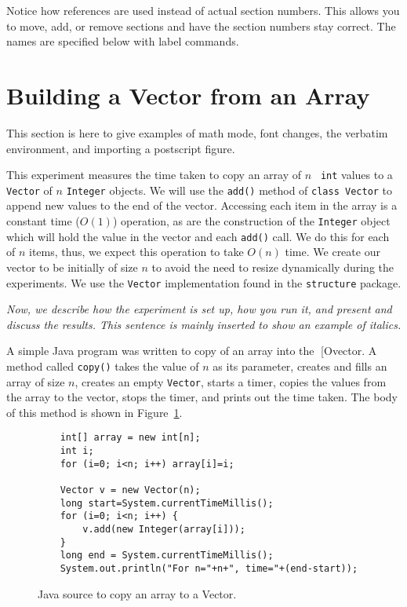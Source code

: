 \documentclass[12pt]{article}
\newcommand{\singlespace}{
  \protect\renewcommand\baselinestretch{1.0}
  \protect\normalsize
}
\begin{document}
Notice how references are used instead of actual section numbers.
This allows you to move, add, or remove sections and have the section
numbers stay correct.  The names are specified below with label commands.

\section{Building a Vector from an Array}
\label{sec:vectarray}

This section is here to give examples of math mode, font changes, the
verbatim environment, and importing a postscript figure.

This experiment measures the time taken to copy an array of $n$ {\tt
int} values to a {\tt Vector} of $n$ {\tt Integer} objects.  We will
use the {\tt add()} method of {\tt class Vector} to append new
values to the end of the vector.  Accessing each item in the array is
a constant time ($O(1)$) operation, as are the construction of the
{\tt Integer} object which will hold the value in the vector and each
{\tt add()} call.  We do this for each of $n$ items, thus, we
expect this operation to take $O(n)$ time.  We create our vector to be
initially of size $n$ to avoid the need to resize dynamically during
the experiments.  We use the {\tt Vector} implementation found in the
{\tt structure} package.


{\it Now, we describe how the experiment is set up, how you run it, and
present and discuss the results.  This sentence is mainly inserted to
show an example of italics.}

A simple Java program was written to copy of an array into the
[Ovector.  A method called {\tt copy()} takes the value of $n$ as its
parameter, creates and fills an array of size $n$, creates an empty
{\tt Vector}, starts a timer, copies the values from the array to the
vector, stops the timer, and prints out the time taken.  The body of
this method is shown in Figure~\ref{fig:code}.

{\singlespace %
\begin{figure}[htb]
\begin{verbatim}
    int[] array = new int[n];
    int i;
    for (i=0; i<n; i++) array[i]=i;
	
    Vector v = new Vector(n);
    long start=System.currentTimeMillis();
    for (i=0; i<n; i++) {
        v.add(new Integer(array[i]));
    }
    long end = System.currentTimeMillis();
    System.out.println("For n="+n+", time="+(end-start));
\end{verbatim}
\caption{Java source to copy an array to a Vector.}
\label{fig:code}
\end{figure}
}
\end{document}
